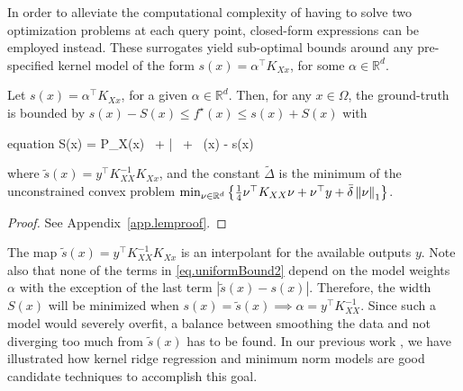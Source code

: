 In order to alleviate the computational complexity of having to solve two optimization problems at each query point, closed-form expressions can be employed instead. These surrogates yield sub-optimal bounds around any pre-specified kernel model of the form $s(x) = \alpha^\top K_{Xx}$, for some $\alpha \in \mathbb{R}^d$. 
\begin{proposition}
	\label{prop:uniform}
	Let $s(x)=\alpha^\top K_{Xx}$, for a given $\alpha \in \mathbb{R}^d$. Then, for any $x\in \Omega$, the ground-truth is bounded by $s(x) - S(x) \leq f^\star(x) \leq s(x) + S(x)$ with
	\begin{empheq}[box={\mymathbox[colback=black!2,drop small lifted shadow, sharp corners]}]{equation}
		S(x) =  P_X(x) \,  + \bar{\delta} \,  + \, \vert {}(x) - s(x) \vert
		\label{eq.uniformBound2}
	\end{empheq}
	where $\tilde{s}(x) = y^\top K_{XX}^{-1} K_{Xx}$, and the constant $\tilde\Delta$ is the minimum of the unconstrained convex problem $\min_{\nu \in \mathbb{R}^d} \left\{ \frac{1}{4}\nu^\top K_{XX}\nu + \nu^\top y + \bar{\delta} \left\| \nu \right\|_1\right\}$.
\end{proposition}
\begin{proof}
	See Appendix~\ref{app.lemproof}.
\end{proof}

The map $\tilde{s}(x) = y^\top K_{XX}^{-1} K_{Xx}$ is an interpolant for the available outputs $y$. Note also that none of the terms in \eqref{eq.uniformBound2} depend on the model weights $\alpha$ with the exception of the last term $|\tilde s(x) - s(x)|$. Therefore, the width $S(x)$ will be minimized when $s(x) = \tilde s(x) \implies \alpha = y^\top K_{XX}^{-1}$. Since such a model would severely overfit, a balance between smoothing the data and not diverging too much from $\tilde s(x)$ has to be found. In our previous work \cite{maddalena2020deterministic}, we have illustrated how kernel ridge regression and minimum norm models are good candidate techniques to accomplish this goal.

